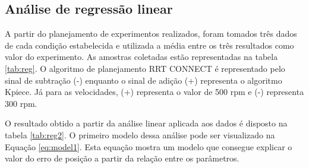 \subsection{Análise de regressão linear}
A partir do planejamento de experimentos realizados, foram tomados três dados de cada condição estabelecida e utilizada a média entre os três resultados como valor do experimento. As amostras coletadas estão representadas na tabela \ref*{tab:reg}. O  algoritmo de planejamento RRT CONNECT é representado pelo sinal de subtração (-) enquanto o sinal de adição (+) representa o algoritmo Kpiece. Já para as velocidades, (+) representa o valor de 500 rpm e (-) representa 300 rpm.
\begin{table}[h!]
  \centering
  \caption{Resultados das amostras coletadas.}
    \label{tab:reg}
  \end{table}
 
O resultado obtido a partir da análise linear aplicada aos dados é disposto na tabela \ref*{tab:reg2}. O primeiro modelo dessa análise pode ser visualizado na Equação \ref*{eq:model1}.  Esta equação mostra um modelo que consegue explicar o valor do erro de posição a partir da relação entre os parâmetros.


\begin{table}[h!]
  \centering
  \caption{Resultados da análise de regressão linear.}
    \label{tab:reg2}
  \end{table}

